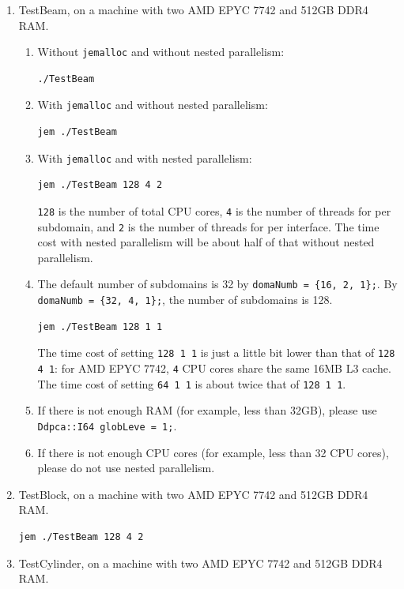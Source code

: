 \begin{enumerate}[label=$\blacksquare$]
\item TestBeam, on a machine with two AMD EPYC 7742 and 512GB DDR4 RAM.
  \begin{enumerate}[label=$\bullet$]
  \item Without \lstinline{jemalloc} and without nested parallelism:
\begin{lstlisting}[breaklines=true]
./TestBeam
\end{lstlisting}
  \item With \lstinline{jemalloc} and without nested parallelism:
\begin{lstlisting}[breaklines=true]
jem ./TestBeam
\end{lstlisting}
  \item With \lstinline{jemalloc} and with nested parallelism:
\begin{lstlisting}[breaklines=true]
jem ./TestBeam 128 4 2
\end{lstlisting}
\lstinline{128} is the number of total CPU cores, \lstinline{4} is the number of threads for per subdomain, and \lstinline{2} is the number of threads for per interface. The time cost with nested parallelism will be about half of that without nested parallelism.
  \item The default number of subdomains is 32 by \lstinline|domaNumb = {16, 2, 1};|. By \lstinline|domaNumb = {32, 4, 1};|, the number of subdomains is 128.
\begin{lstlisting}[breaklines=true]
jem ./TestBeam 128 1 1
\end{lstlisting}
The time cost of setting \lstinline|128 1 1| is just a little bit lower than that of \lstinline|128 4 1|: for AMD EPYC 7742, \lstinline{4} CPU cores share the same 16MB L3 cache. The time cost of setting \lstinline|64 1 1| is about twice that of \lstinline|128 1 1|.
  \item If there is not enough RAM (for example, less than 32GB), please use \lstinline|Ddpca::I64 globLeve = 1;|.
  \item If there is not enough CPU cores (for example, less than 32 CPU cores), please do not use nested parallelism.
  \end{enumerate}
\item TestBlock, on a machine with two AMD EPYC 7742 and 512GB DDR4 RAM.
\begin{lstlisting}[breaklines=true]
jem ./TestBeam 128 4 2
\end{lstlisting}
\item TestCylinder, on a machine with two AMD EPYC 7742 and 512GB DDR4 RAM.

\end{enumerate}

